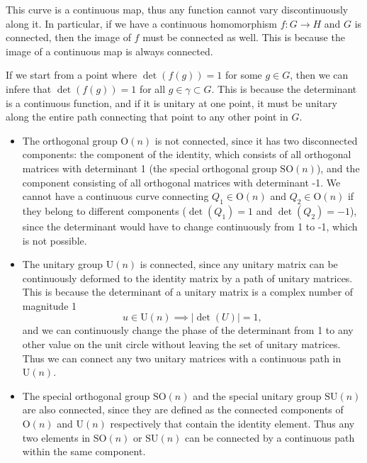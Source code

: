 This curve is a continuous map, thus any function cannot vary discontinuously along it. In particular, if we have a continuous homomorphism \(f : G \to H\) and \(G\) is connected, then the image of \(f\) must be connected as well. This is because the image of a continuous map is always connected.

If we start from a point where \(\det(f(g)) = 1\) for some \(g \in G\), then we can infere that \(\det(f(g)) = 1\) for all \(g \in \gamma \subset G\). This is because the determinant is a continuous function, and if it is unitary at one point, it must be unitary along the entire path connecting that point to any other point in \(G\).

\begin{example}
    \begin{itemize}
        \item The orthogonal group \(\mathrm{O}(n)\) is not connected, since it has two disconnected components: the component of the identity, which consists of all orthogonal matrices with determinant 1 (the special orthogonal group \(\mathrm{SO}(n)\)), and the component consisting of all orthogonal matrices with determinant -1. We cannot have a continuous curve connecting \(Q_1 \in \mathrm{O}(n) \) and \(Q_2 \in \mathrm{O}(n)\) if they belong to different components (\(\det(Q_1)=1\) and \(\det(Q_2)=-1\)), since the determinant would have to change continuously from 1 to -1, which is not possible.

        \item The unitary group \(\mathrm{U}(n)\) is connected, since any unitary matrix can be continuously deformed to the identity matrix by a path of unitary matrices. This is because the determinant of a unitary matrix is a complex number of magnitude 1
              \[
                  u \in \mathrm{U}(n) \implies \vert \det(U) \vert = 1,
              \]
              and we can continuously change the phase of the determinant from 1 to any other value on the unit circle without leaving the set of unitary matrices. Thus we can connect any two unitary matrices with a continuous path in \(\mathrm{U}(n)\).

        \item The special orthogonal group \(\mathrm{SO}(n)\) and the special unitary group \(\mathrm{SU}(n)\) are also connected, since they are defined as the connected components of \(\mathrm{O}(n)\) and \(\mathrm{U}(n)\) respectively that contain the identity element. Thus any two elements in \(\mathrm{SO}(n)\) or \(\mathrm{SU}(n)\) can be connected by a continuous path within the same component.
    \end{itemize}
\end{example}

